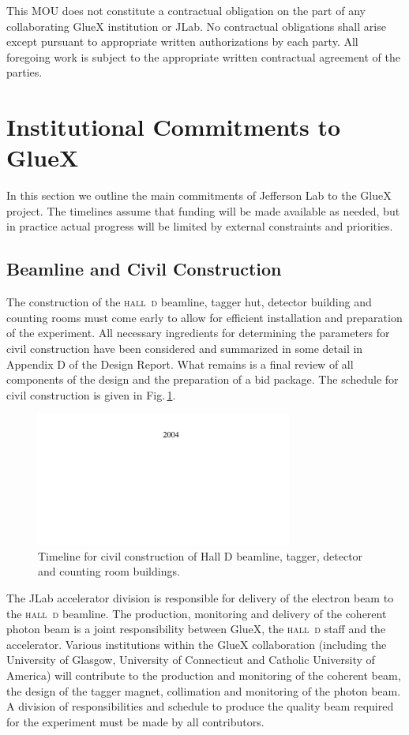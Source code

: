 \documentclass[oneside,12pt,letterpaper]{article}
\newcommand{\hd}{\mbox{\textsc{hall d}}}
\newcommand{\gx}{\mbox{GlueX}}
\newcommand{\instname}{Jefferson Lab}
\begin{document}
This MOU does not constitute a contractual obligation on the part of 
any collaborating \gx{} institution or JLab. No contractual obligations 
shall arise except pursuant to appropriate written authorizations by each 
party. All foregoing work is subject to the appropriate written contractual 
agreement of the parties.

\section{Institutional Commitments to \gx{} }
In this section we outline the main commitments of \instname{} to the GlueX 
project. The timelines assume that funding will be made available 
as needed, but in practice actual progress will be limited by
external constraints and priorities. 


\subsection{Beamline and Civil Construction}
The construction of the \hd{} beamline, tagger hut, detector
building and counting rooms must come early to allow for efficient
installation and preparation of the experiment.
All necessary ingredients for determining
the parameters for civil construction have been considered and summarized in
some detail in Appendix D of the Design Report. What remains 
is a final review of all components of the design and 
the preparation of a bid package. The schedule for civil construction
is given in Fig.\,\ref{fig:civil_timeline}.


\begin{figure}[h!]\centering
\includegraphics[width=0.75\textwidth]{civil_timeline.pdf}
\caption[]{\label{fig:civil_timeline}
Timeline for civil construction of Hall D beamline, tagger, 
detector and counting room buildings.}
\end{figure}

The JLab accelerator division is responsible for delivery of
the electron beam to the \hd{} beamline. The production,
monitoring and delivery of the coherent photon beam is a joint responsibility
between GlueX, the \hd{} staff and the accelerator. Various
institutions within the \gx{} collaboration (including
the University of Glasgow, University of Connecticut
and Catholic University of America) will contribute to
the production and monitoring of the coherent beam, the design of the tagger magnet, 
collimation and monitoring of the photon beam. A division of
responsibilities and schedule to produce the quality beam
required for the experiment must be made by all contributors.
\end{document}
